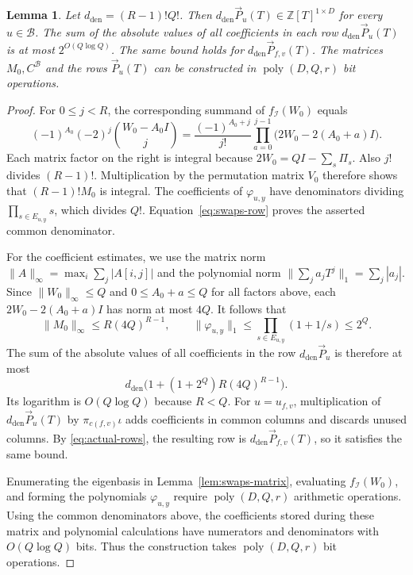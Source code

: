 \documentclass[11pt,reqno]{amsart}
\numberwithin{equation}{section}
\newtheorem{lemma}[theorem]{Lemma}
\theoremstyle{definition}\newtheorem{definition}[theorem]{Definition}
\theoremstyle{remark}\newtheorem{remark}[theorem]{Remark}
\newcommand{\poly}{\operatorname{poly}}
\renewcommand{\le}{\leqslant}
\begin{document}
\begin{lemma}\label{lem:row-coefficients}
Let $d_{\mathrm{den}}=(R-1)!Q!$. Then
$d_{\mathrm{den}}\vec{P}_u(T)\in\mathbb Z[T]^{1\times D}$ for every $u\in\mathcal B$. The sum of the absolute values of all coefficients
in each row $d_{\mathrm{den}}\vec{P}_u(T)$ is at most $2^{O(Q\log Q)}$.
The same bound holds for $d_{\mathrm{den}}\vec{P}_{f,v}(T)$.
The matrices $M_0,C^{\mathcal B}$ and the rows $\vec{P}_u(T)$ can be
constructed in $\poly(D,Q,r)$ bit operations.
\end{lemma}
\begin{proof}
For $0\le j<R$, the corresponding summand of
$f_{\mathcal I}(W_0)$ equals
\[
 (-1)^{A_0}(-2)^j\binom{W_0-A_0I}{j}
 =\frac{(-1)^{A_0+j}}{j!}
   \prod_{a=0}^{j-1}\bigl(2W_0-2(A_0+a)I\bigr).
\]
Each matrix factor on the right is integral because
$2W_0=QI-\sum_s\Pi_s$. Also $j!$ divides $(R-1)!$.
Multiplication by the permutation matrix $V_0$ therefore shows that
$(R-1)!M_0$ is integral. The coefficients of $\varphi_{u,y}$ have
denominators dividing $\prod_{s\in E_{u,y}}s$, which divides $Q!$.
Equation~\eqref{eq:swaps-row} proves the asserted common denominator.

For the coefficient estimates, we use the matrix norm
$\|A\|_\infty=\max_i\sum_j|A[i,j]|$ and
the polynomial norm $\|\sum_j a_jT^j\|_1=\sum_j|a_j|$.
Since $\|W_0\|_\infty\le Q$ and $0\le A_0+a\le Q$ for all
factors above, each $2W_0-2(A_0+a)I$ has norm at most $4Q$.
It follows that
\[
 \|M_0\|_\infty\le R(4Q)^{R-1},\qquad
 \|\varphi_{u,y}\|_1
 \le\prod_{s\in E_{u,y}}(1+1/s)\le2^Q.
\]
The sum of the absolute values of all coefficients in the row
$d_{\mathrm{den}}\vec{P}_u$ is therefore at most
\[
 d_{\mathrm{den}}\bigl(1+(1+2^Q)R(4Q)^{R-1}\bigr).
\]
Its logarithm is $O(Q\log Q)$ because $R<Q$.
For $u=u_{f,v}$, multiplication of $d_{\mathrm{den}}\vec{P}_u(T)$ by
$\pi_{c(f,v)}\iota$ adds coefficients in common columns and discards
unused columns. By \eqref{eq:actual-rows}, the resulting row is
$d_{\mathrm{den}}\vec{P}_{f,v}(T)$, so it satisfies the same bound.

Enumerating the eigenbasis in Lemma~\ref{lem:swaps-matrix}, evaluating
$f_{\mathcal I}(W_0)$, and forming the polynomials $\varphi_{u,y}$
require $\poly(D,Q,r)$ arithmetic operations. Using the common
denominators above, the coefficients stored during these matrix
and polynomial calculations have numerators and denominators with
$O(Q\log Q)$ bits. Thus the construction takes $\poly(D,Q,r)$ bit
operations.
\end{proof}
\end{document}
